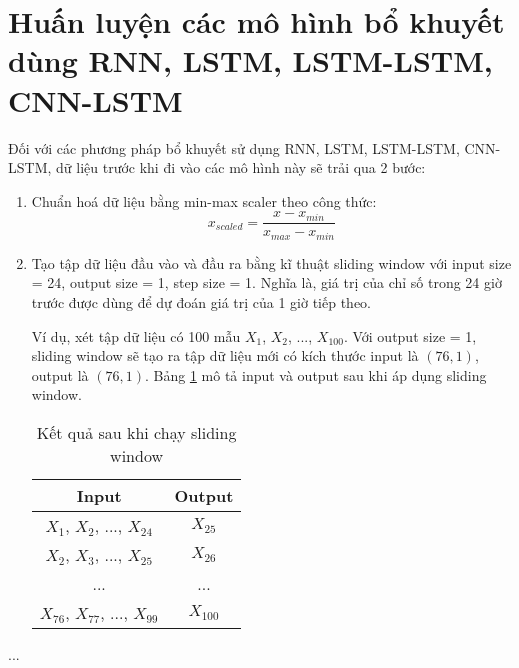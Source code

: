 \section{Huấn luyện các mô hình bổ khuyết dùng RNN, LSTM, LSTM-LSTM, CNN-LSTM}
Đối với các phương pháp bổ khuyết sử dụng RNN, LSTM, LSTM-LSTM, CNN-LSTM, dữ liệu trước khi đi vào các mô hình này sẽ trải qua 2 bước:
\begin{enumerate}
    \item Chuẩn hoá dữ liệu bằng min-max scaler theo công thức:
\begin{equation}
x_{scaled}= \frac{x-x_{min}}{x_{max}-x_{min}} \label{section5_3_min_max_scale}
\end{equation}
    \item Tạo tập dữ liệu đầu vào và đầu ra bằng kĩ thuật sliding window với input size = 24, output size = 1, step size = 1. Nghĩa là, giá trị của chỉ số trong 24 giờ trước được dùng để dự đoán giá trị của 1 giờ tiếp theo.  
    
Ví dụ, xét tập dữ liệu có 100 mẫu $X_1$, $X_2$, ..., $X_{100}$. Với output size = 1, sliding window sẽ tạo ra tập dữ liệu mới có kích thước input là $(76, 1)$, output là $(76,1)$. Bảng \ref{tab:section5_3_slidingwindow} mô tả input và output sau khi áp dụng sliding window.

\begin{table}[h]
    \centering
    \caption{Kết quả sau khi chạy sliding window}
    \begin{tabular}{|c|c|}
    \hline
      Input   & Output \\
      \hline
      $X_1$, $X_2$, ..., $X_{24}$   & $X_{25}$\\
      \hline
      $X_2$, $X_3$, ..., $X_{25}$   & $X_{26}$\\
      \hline
      ... & ... \\
      \hline
      $X_{76}$, $X_{77}$, ..., $X_{99}$   & $X_{100}$\\
      \hline
    \end{tabular}
    \label{tab:section5_3_slidingwindow}
\end{table}
\end{enumerate}
...